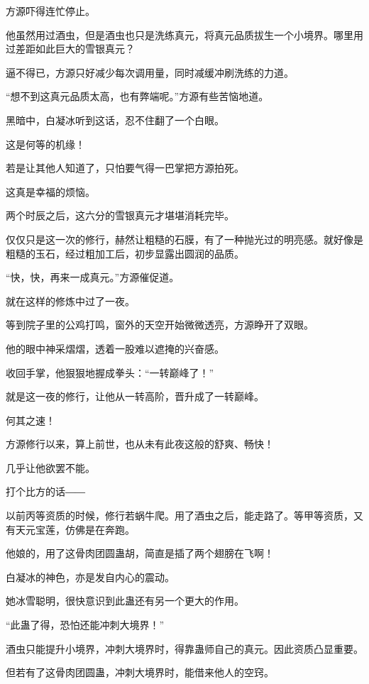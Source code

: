 
\begin{this_body}

方源吓得连忙停止。

他虽然用过酒虫，但是酒虫也只是洗练真元，将真元品质拔生一个小境界。哪里用过差距如此巨大的雪银真元？

逼不得已，方源只好减少每次调用量，同时减缓冲刷洗练的力道。

“想不到这真元品质太高，也有弊端呢。”方源有些苦恼地道。

黑暗中，白凝冰听到这话，忍不住翻了一个白眼。

这是何等的机缘！

若是让其他人知道了，只怕要气得一巴掌把方源拍死。

这真是幸福的烦恼。

两个时辰之后，这六分的雪银真元才堪堪消耗完毕。

仅仅只是这一次的修行，赫然让粗糙的石膜，有了一种抛光过的明亮感。就好像是粗糙的玉石，经过粗加工后，初步显露出圆润的品质。

“快，快，再来一成真元。”方源催促道。

就在这样的修炼中过了一夜。

等到院子里的公鸡打鸣，窗外的天空开始微微透亮，方源睁开了双眼。

他的眼中神采熠熠，透着一股难以遮掩的兴奋感。

收回手掌，他狠狠地握成拳头：“一转巅峰了！”

就是这一夜的修行，让他从一转高阶，晋升成了一转巅峰。

何其之速！

方源修行以来，算上前世，也从未有此夜这般的舒爽、畅快！

几乎让他欲罢不能。

打个比方的话――

以前丙等资质的时候，修行若蜗牛爬。用了酒虫之后，能走路了。等甲等资质，又有天元宝莲，仿佛是在奔跑。

他娘的，用了这骨肉团圆蛊胡，简直是插了两个翅膀在飞啊！

白凝冰的神色，亦是发自内心的震动。

她冰雪聪明，很快意识到此蛊还有另一个更大的作用。

“此蛊了得，恐怕还能冲刺大境界！”

酒虫只能提升小境界，冲刺大境界时，得靠蛊师自己的真元。因此资质凸显重要。

但若有了这骨肉团圆蛊，冲刺大境界时，能借来他人的空窍。


\end{this_body}
